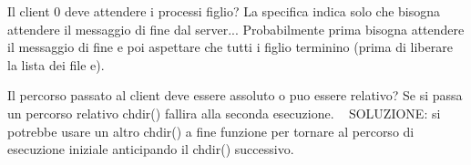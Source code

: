 \begin{DoxyRefList}
Il client 0 deve attendere i processi figlio? La specifica indica solo che bisogna attendere il messaggio di fine dal server... Probabilmente prima bisogna attendere il messaggio di fine e poi aspettare che tutti i figlio terminino (prima di liberare la lista dei file e).

Il percorso passato al client deve essere assoluto o puo\textquotesingle{} essere relativo? Se si passa un percorso relativo chdir() fallira\textquotesingle{} alla seconda esecuzione. ~\newline
 S\+O\+L\+U\+Z\+I\+O\+NE\+: si potrebbe usare un altro chdir() a fine funzione per tornare al percorso di esecuzione iniziale anticipando il chdir() successivo.
\end{DoxyRefList}